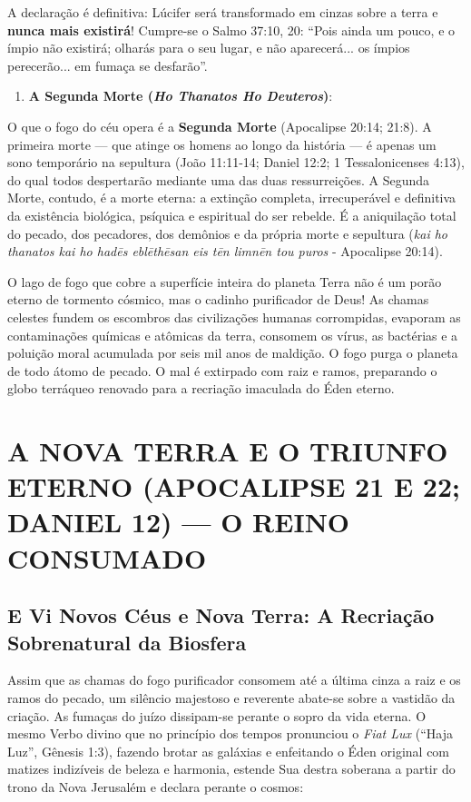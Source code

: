 \documentclass[11pt,a4paper,openany]{book}
\begin{document}
A declaração é definitiva: Lúcifer será transformado em cinzas sobre a terra e \textbf{nunca mais existirá}! Cumpre-se o Salmo 37:10, 20: ``Pois ainda um pouco, e o ímpio não existirá; olharás para o seu lugar, e não aparecerá... os ímpios perecerão... em fumaça se desfarão''.

\begin{enumerate}
  \item \textbf{A Segunda Morte (\textit{Ho Thanatos Ho Deuteros})}:
\end{enumerate}

O que o fogo do céu opera é a \textbf{Segunda Morte} (Apocalipse 20:14; 21:8).
A primeira morte — que atinge os homens ao longo da história — é apenas um sono temporário na sepultura (João 11:11-14; Daniel 12:2; 1 Tessalonicenses 4:13), do qual todos despertarão mediante uma das duas ressurreições.
A Segunda Morte, contudo, é a morte eterna: a extinção completa, irrecuperável e definitiva da existência biológica, psíquica e espiritual do ser rebelde. É a aniquilação total do pecado, dos pecadores, dos demônios e da própria morte e sepultura (\textit{kai ho thanatos kai ho hadēs eblēthēsan eis tēn limnēn tou puros} - Apocalipse 20:14).

O lago de fogo que cobre a superfície inteira do planeta Terra não é um porão eterno de tormento cósmico, mas o cadinho purificador de Deus! As chamas celestes fundem os escombros das civilizações humanas corrompidas, evaporam as contaminações químicas e atômicas da terra, consomem os vírus, as bactérias e a poluição moral acumulada por seis mil anos de maldição.
O fogo purga o planeta de todo átomo de pecado. O mal é extirpado com raiz e ramos, preparando o globo terráqueo renovado para a recriação imaculada do Éden eterno.



\section{A NOVA TERRA E O TRIUNFO ETERNO (APOCALIPSE 21 E 22; DANIEL 12) — O REINO CONSUMADO}



\subsection{E Vi Novos Céus e Nova Terra: A Recriação Sobrenatural da Biosfera}


Assim que as chamas do fogo purificador consomem até a última cinza a raiz e os ramos do pecado, um silêncio majestoso e reverente abate-se sobre a vastidão da criação. As fumaças do juízo dissipam-se perante o sopro da vida eterna. O mesmo Verbo divino que no princípio dos tempos pronunciou o \textit{Fiat Lux} (``Haja Luz'', Gênesis 1:3), fazendo brotar as galáxias e enfeitando o Éden original com matizes indizíveis de beleza e harmonia, estende Sua destra soberana a partir do trono da Nova Jerusalém e declara perante o cosmos:
\end{document}
